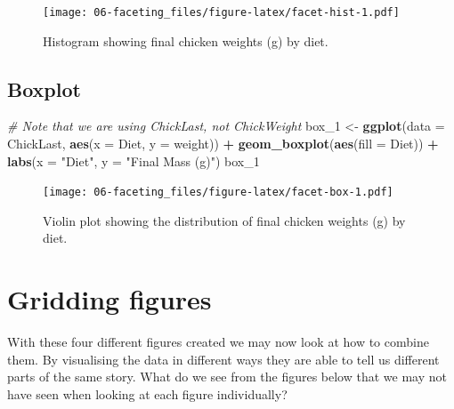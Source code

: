 \documentclass[
]{book}
\newenvironment{Shaded}{\begin{snugshade}}{\end{snugshade}}
\newcommand{\CommentTok}[1]{\textcolor[rgb]{0.56,0.35,0.01}{\textit{#1}}}
\newcommand{\DataTypeTok}[1]{\textcolor[rgb]{0.13,0.29,0.53}{#1}}
\newcommand{\DecValTok}[1]{\textcolor[rgb]{0.00,0.00,0.81}{#1}}
\newcommand{\KeywordTok}[1]{\textcolor[rgb]{0.13,0.29,0.53}{\textbf{#1}}}
\newcommand{\NormalTok}[1]{#1}
\newcommand{\OperatorTok}[1]{\textcolor[rgb]{0.81,0.36,0.00}{\textbf{#1}}}
\newcommand{\StringTok}[1]{\textcolor[rgb]{0.31,0.60,0.02}{#1}}
\begin{document}
\begin{figure}
\centering
\texttt{[image: 06-faceting\_files/figure-latex/facet-hist-1.pdf]}
\caption{\label{fig:facet-hist}Histogram showing final chicken weights (g) by diet.}
\end{figure}

\hypertarget{boxplot}{%
\subsection{Boxplot}\label{boxplot}}

\begin{Shaded}
\begin{Highlighting}[]
\CommentTok{\# Note that we are using \textquotesingle{}ChickLast\textquotesingle{}, not \textquotesingle{}ChickWeight\textquotesingle{}}
\NormalTok{box\_}\DecValTok{1}\NormalTok{ <{-}}\StringTok{ }\KeywordTok{ggplot}\NormalTok{(}\DataTypeTok{data =}\NormalTok{ ChickLast, }\KeywordTok{aes}\NormalTok{(}\DataTypeTok{x =}\NormalTok{ Diet, }\DataTypeTok{y =}\NormalTok{ weight)) }\OperatorTok{+}
\StringTok{  }\KeywordTok{geom\_boxplot}\NormalTok{(}\KeywordTok{aes}\NormalTok{(}\DataTypeTok{fill =}\NormalTok{ Diet)) }\OperatorTok{+}
\StringTok{  }\KeywordTok{labs}\NormalTok{(}\DataTypeTok{x =} \StringTok{"Diet"}\NormalTok{, }\DataTypeTok{y =} \StringTok{"Final Mass (g)"}\NormalTok{)}
\NormalTok{box\_}\DecValTok{1}
\end{Highlighting}
\end{Shaded}

\begin{figure}
\centering
\texttt{[image: 06-faceting\_files/figure-latex/facet-box-1.pdf]}
\caption{\label{fig:facet-box}Violin plot showing the distribution of final chicken weights (g) by diet.}
\end{figure}

\hypertarget{gridding-figures}{%
\section{Gridding figures}\label{gridding-figures}}

With these four different figures created we may now look at how to combine them. By visualising the data in different ways they are able to tell us different parts of the same story. What do we see from the figures below that we may not have seen when looking at each figure individually?
\end{document}
